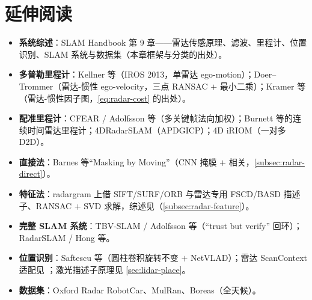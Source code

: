 \section*{延伸阅读}
\begin{itemize}
  \item \textbf{系统综述}：SLAM Handbook\cite{carlone2026handbook} 第 9 章——雷达传感原理、滤波、里程计、位置识别、SLAM 系统与数据集（本章框架与分类的出处）。
  \item \textbf{多普勒里程计}：Kellner 等\cite{kellner2013doppler}（IROS 2013，单雷达 ego-motion）；Doer--Trommer\cite{doer2020radarinertial}（雷达-惯性 ego-velocity，三点 RANSAC $+$ 最小二乘）；Kramer 等\cite{kramer2021radarinertial}（雷达-惯性因子图，\cref{eq:radar-cost} 的出处）。
  \item \textbf{配准里程计}：CFEAR / Adolfsson 等\cite{adolfsson2021cfear}（多关键帧法向加权）；Burnett 等的连续时间雷达里程计\cite{burnett2021radarct}；4DRadarSLAM\cite{zhang20234dradarslam}（APDGICP）；4D iRIOM\cite{zhang20234diriom}（一对多 D2D）。
  \item \textbf{直接法}：Barnes 等“Masking by Moving”\cite{barnes2020masking}（CNN 掩膜 $+$ 相关，\cref{subsec:radar-direct}）。
  \item \textbf{特征法}：radargram 上借 SIFT/SURF/ORB 与雷达专用 FSCD/BASD 描述子、RANSAC $+$ SVD 求解，综述见\cite{carlone2026handbook}（\cref{subsec:radar-feature}）。
  \item \textbf{完整 SLAM 系统}：TBV-SLAM / Adolfsson 等\cite{adolfsson2023tbv}（“trust but verify” 回环）；RadarSLAM / Hong 等\cite{hong2022radarslam}。
  \item \textbf{位置识别}：Saftescu 等\cite{saftescu2020kidnapped}（圆柱卷积旋转不变 $+$ NetVLAD）；雷达 ScanContext 适配见 \cite{adolfsson2023tbv}；激光描述子原理见 \cref{sec:lidar-place}。
  \item \textbf{数据集}：Oxford Radar RobotCar\cite{barnes2020oxford}、MulRan\cite{kim2020mulran}、Boreas\cite{burnett2023boreas}（全天候）。
\end{itemize}

